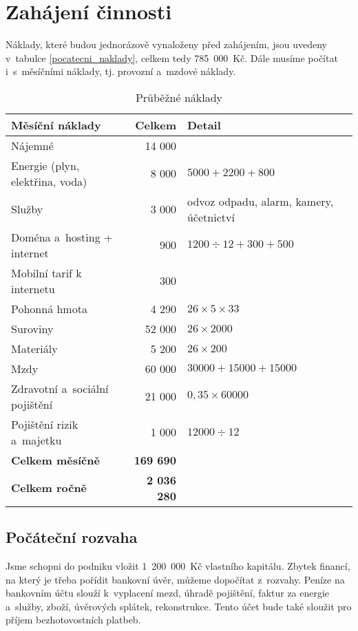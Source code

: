 \section{Zahájení činnosti}
Náklady, které budou jednorázově vynaloženy před zahájením, jsou uvedeny v~tabulce \ref{pocatecni_naklady}, celkem tedy 785~000~Kč. Dále musíme počítat i~s~měsíčními náklady, tj. provozní a~mzdové náklady.


\begin{table}[htbp]
\begin{center}
\begin{tabular}{ l r l }

\textbf{Měsíční náklady\index{náklad}} & \textbf{Celkem} & \textbf{Detail} \\ \hline 
Nájemné & 14 000 & \\ 
Energie (plyn, elektřina, voda) & 8 000 & $5000 + 2200 + 800$ \\ 
Služby & 3 000 & odvoz odpadu, alarm, kamery, účetnictví\\ 
Doména a~hosting + internet & 900 & $1200 \div 12 + 300 + 500$ \\ 
Mobilní tarif k internetu & 300 & \\ 
Pohonná hmota & 4 290 & $26 \times 5 \times 33$ \\ 
Suroviny & 52 000 & $26 \times 2 000$ \\ 
Materiály & 5 200 & $26 \times 200$ \\ 
Mzdy\index{mzda} & 60 000 & $30000 + 15000 + 15000$ \\ 
Zdravotní a~sociální pojištění & 21 000 & $0,35 \times 60 000$ \\ 
Pojištění rizik a~majetku & 1 000 & $12 000 \div 12$\\ \hline 
\textbf{Celkem měsíčně} & \textbf{169 690} & \\ 
\textbf{Celkem ročně} & \textbf{2 036 280} & \\

\end{tabular}
\caption{Průběžné náklady}
\label{prubezne_naklady}
\end{center}
\end{table}

\subsection{Počáteční rozvaha}
Jsme schopni do podniku vložit 1~200~000~Kč vlastního kapitálu. Zbytek financí, na který je třeba pořídit bankovní úvěr, můžeme dopočítat z~rozvahy. Peníze na bankovním účtu slouží k~vyplacení mezd, úhradě pojištění, faktur za energie a~služby, zboží, úvěrových splátek, rekonstrukce. Tento účet bude také sloužit pro příjem bezhotovostních platbeb.

